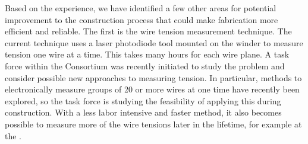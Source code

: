 Based on the  experience, we have identified a few other areas for potential improvement to the construction process that could make  fabrication more efficient and reliable.   The first is the wire tension measurement technique. The current technique uses a laser photodiode tool mounted on the winder to measure tension one wire at a time. This takes many hours for each wire plane. A task force within the Consortium was recently initiated to study the problem and consider possible new approaches to measuring tension.  In particular, methods to electronically measure groups of \num{20} or more wires at one time have recently been explored, so the task force is studying the feasibility of applying this during  construction. With a less labor intensive and faster method, it also becomes possible to measure more of the wire tensions later in the lifetime, for example at the .  





